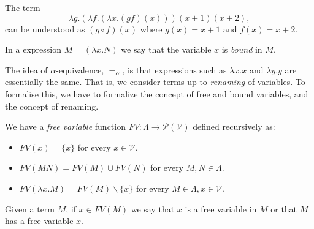 \begin{example} The term $$\lambda g.(\lambda f.(\lambda x. (gf)(x) )) (x+1)(x+2),$$
  can be understood as $(g\circ f) (x)$ where $g(x) = x+1$ and $f(x)=x+2$.
\end{example}

In a expression $M = (\lambda x. N)$ we say that the variable $x$ is \emph{bound} in $M$.


The idea of $\alpha$-equivalence, $=_{\alpha}$, is that expressions such as $\lambda x.x$ and $\lambda y.y$ are essentially the same. That is, we consider terms up to \emph{renaming} of variables. To formalise this, we have to formalize the concept of free and bound variables, and the concept of renaming.

\begin{definition}
  We have a \emph{free variable} function $FV:\Lambda \to \mathcal{P}(\mathcal{V})$ defined recursively as:
  \begin{itemize}
  \item $FV(x) = \{x\}$ for every $x\in \mathcal{V}$.
  \item $FV(MN) = FV(M)\cup FV(N)$ for every $M,N\in \Lambda$.
  \item $FV(\lambda x.M) = FV(M)\backslash \{x\}$ for every $M\in \Lambda, x\in \mathcal{V}$.
  \end{itemize}
  Given a term $M$, if $x\in FV(M)$ we say that $x$ is a free variable in $M$ or that $M$ has a free variable $x$.
\end{definition}

